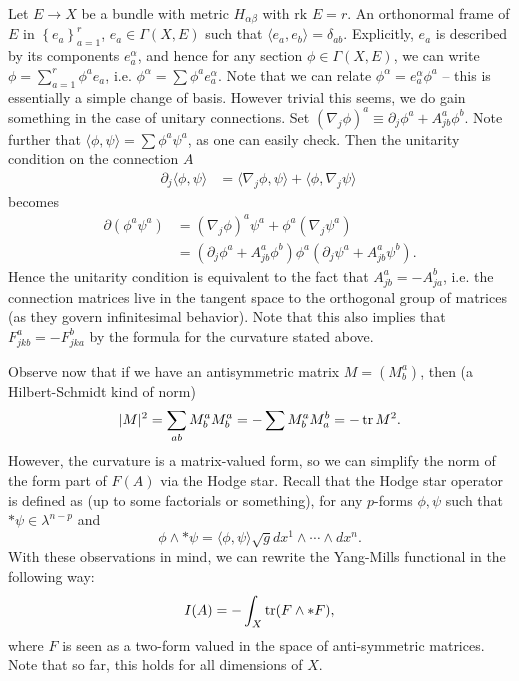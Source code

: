 \documentclass{../mathnotes}
\begin{document}
Let $E\to X$ be a bundle with metric $H_{\alpha\beta}$ with $\text{rk } E=r$. An
orthonormal frame of $E$ in $\left\{ e_a \right\}^r_{a=1}$, $e_a\in\Gamma(X,E)$ such that $\langle e_a,e_b\rangle=\delta_{ab}$.
Explicitly, $e_a$ is described by its components $e_a^\alpha$, and hence for any section $\phi\in\Gamma(X,E)$,
we can write $\phi=\sum_{a=1}^r\phi^ae_a$, i.e. $\phi^\alpha=\sum\phi^a e^\alpha_a$.
Note that we can relate $\phi^\alpha=e^\alpha_a\phi^a$ -- this is essentially a simple change of basis. However trivial this seems,
we do gain something in the case of unitary connections. Set $(\nabla_j\phi)^a\equiv\partial_j\phi^a+A^a_{jb}\phi^b$.
Note further that $\langle\phi,\psi\rangle=\sum\phi^a\psi^a$, as one can easily check.
Then the unitarity condition on the connection $A$ 
\begin{align*}
    \partial_j\langle\phi,\psi\rangle&=\langle\nabla_j\phi,\psi\rangle+\langle\phi,\nabla_j\psi\rangle\
\end{align*}
becomes
\begin{align*}
    \partial(\phi^a\psi^a)&=(\nabla_j\phi)^a\psi^a+\phi^a(\nabla_j\psi^a)\\
    &=(\partial_j\phi^a+A_{jb}^a\phi^b)\phi^a(\partial_j\psi^a+A_{jb}^a\psi^b).
\end{align*}
Hence the unitarity condition is equivalent to the fact that $A^a_{jb}=-A_{ja}^b$, i.e. the connection
matrices live in the tangent space to the orthogonal group of matrices (as they govern infinitesimal behavior).
Note that this also implies that $F_{jkb}^a=-F_{jka}^b$ by the formula for the curvature stated above.

Observe now that if we have an antisymmetric matrix $M=(M^a_b)$, then (a Hilbert-Schmidt kind of norm)
\[|M|^2=\sum_{ab}M^a_bM^a_b=-\sum M^a_bM^b_a=-\operatorname{tr} M^2.\]
However, the curvature is a matrix-valued form, so we can simplify the norm of the form part of $F(A)$ via the Hodge star.
Recall that the Hodge star operator is defined as (up to some factorials or something), for any $p$-forms $\phi,\psi$
such that $*\psi\in\lambda^{n-p}$ and 
\[\phi\wedge*\psi=\langle\phi,\psi\rangle\sqrt{g}dx^1\wedge\cdots\wedge dx^n.\]
With these observations in mind, we can rewrite the Yang-Mills functional in the following way:
\[I(A)=-\int_X\operatorname{tr}(F\wedge*F),\]
where $F$ is seen as a two-form valued in the space of anti-symmetric matrices. Note that so far,
this holds for all dimensions of $X$.
\end{document}
